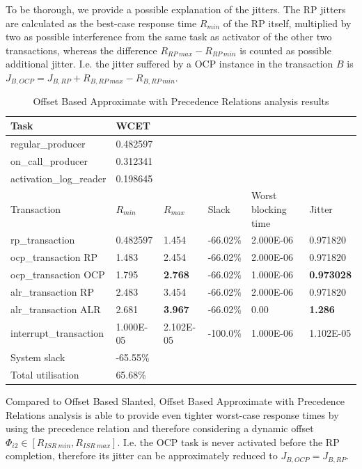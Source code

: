 \documentclass{article}
\begin{document}
To be thorough, we provide a possible explanation of the jitters. The RP jitters are calculated as the best-case response time $R_{min}$ of the RP itself, multiplied by two as possible interference from the same task as activator of the other two transactions, whereas the difference $R_{RP\ max} - R_{RP\ min}$ is counted as possible additional jitter. I.e. the jitter suffered by a OCP instance in the transaction $B$ is $J_{B, OCP} = J_{B, RP} + R_{B, RP\ max} - R_{B, RP\ min}$.

\begin{table}[!htbp]
  \centering
  \begin{tabular}{llllll}
   \toprule
   Task & WCET \\
   \midrule
   regular\_producer & 0.482597 \\
   on\_call\_producer & 0.312341 \\
   activation\_log\_reader & 0.198645 \\
   \toprule
   \toprule
   Transaction & $R_{min}$ & $R_{max}$ & Slack & Worst blocking time & Jitter \\
   \midrule
   rp\_transaction & 0.482597 & 1.454 & -66.02\% &  2.000E-06 & 0.971820 \\
   ocp\_transaction RP & 1.483 & 2.454 & -66.02\% & 2.000E-06 & 0.971820 \\
   ocp\_transaction OCP & 1.795 & \textbf{2.768} & -66.02\% & 1.000E-06 & \textbf{0.973028} \\
   alr\_transaction RP & 2.483 & 3.454 & -66.02\% & 2.000E-06 & 0.971820 \\
   alr\_transaction ALR & 2.681 & \textbf{3.967} & -66.02\% & 0.00 & \textbf{1.286} \\
   interrupt\_transaction & 1.000E-05 & 2.102E-05 & -100.0\% & 1.000E-06 & 1.102E-05 \\
   \toprule
   \toprule
   System slack & -65.55\% \\
   Total utilisation & 65.68\% \\
  \end{tabular}
  \caption{Offset Based Approximate with Precedence Relations analysis results }
  \label{tab:off-approx-w-pr-fps}
\end{table}

Compared to Offset Based Slanted, Offset Based Approximate with Precedence Relations analysis is able to provide even tighter worst-case response times by using the precedence relation and therefore considering a dynamic offset $\Phi_{i2} \in [R_{ISR\ min}, R_{ISR\ max}]$. I.e. the OCP task is never activated before the RP completion, therefore its jitter can be approximately reduced to $J_{B, OCP} = J_{B, RP}$.
\end{document}
